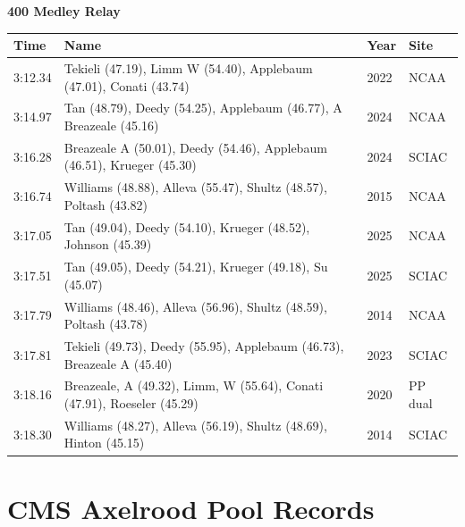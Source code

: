 \noindent\begin{minipage}[t]{0.98\textwidth}
\centering
\textbf{\textcolor{teamprimary}{400 Medley Relay}}\par
\vspace{0.5em}
\centering
\small
\renewcommand{\arraystretch}{1.0}
\setlength{\tabcolsep}{4pt}
\begin{tabular}{@{}p{2.7cm}p{4.3cm}p{1.6cm}p{2.7cm}@{}}
\toprule
\textbf{Time} & \textbf{Name} & \textbf{Year} & \textbf{Site} \\
\midrule
3:12.34 & Tekieli (47.19), Limm W (54.40), Applebaum (47.01), Conati (43.74) & 2022 & NCAA \\
3:14.97 & Tan (48.79), Deedy (54.25), Applebaum (46.77), A Breazeale (45.16) & 2024 & NCAA \\
3:16.28 & Breazeale A (50.01), Deedy (54.46), Applebaum (46.51), Krueger (45.30) & 2024 & SCIAC \\
3:16.74 & Williams (48.88), Alleva (55.47), Shultz (48.57), Poltash (43.82) & 2015 & NCAA \\
3:17.05 & Tan (49.04), Deedy (54.10), Krueger (48.52), Johnson (45.39) & 2025 & NCAA \\
3:17.51 & Tan (49.05), Deedy (54.21), Krueger (49.18), Su (45.07) & 2025 & SCIAC \\
3:17.79 & Williams (48.46), Alleva (56.96), Shultz (48.59), Poltash (43.78) & 2014 & NCAA \\
3:17.81 & Tekieli (49.73), Deedy (55.95), Applebaum (46.73), Breazeale A (45.40) & 2023 & SCIAC \\
3:18.16 & Breazeale, A (49.32), Limm, W (55.64), Conati (47.91), Roeseler (45.29) & 2020 & PP dual \\
3:18.30 & Williams (48.27), Alleva (56.19), Shultz (48.69), Hinton (45.15) & 2014 & SCIAC \\
\bottomrule
\end{tabular}
\end{minipage}
\vspace{-0.5em}
\clearpage
\section{CMS Axelrood Pool Records}
\clearpage
